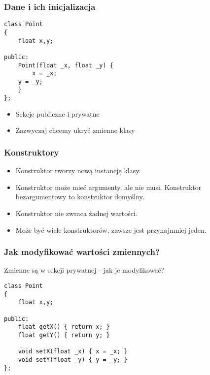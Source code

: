 \documentclass[pdftex, smaller]{beamer}
\begin{document}
\begin{frame}[fragile]
\frametitle{Dane i ich inicjalizacja}

\begin{lstlisting}
class Point
{
    float x,y;
    
public:
    Point(float _x, float _y) {
    	x = _x;
	y = _y;
    }
};
\end{lstlisting}

\begin{itemize}
\item Sekcje publiczne i prywatne
\item Zazwyczaj chcemy ukryć zmienne klasy
\end{itemize}

\end{frame}

\begin{frame}
\frametitle{Konstruktory}

\begin{itemize}
\item Konstruktor tworzy nową instancję klasy.
\item Konstruktor może mieć argumenty, ale nie musi. Konstruktor bezargumentowy to konstruktor domyślny.
\item Konstruktor nie zwraca żadnej wartości.
\item Może być wiele konstruktorów, zawsze jest przynajmniej jeden.
\end{itemize}

\end{frame}

\begin{frame}[fragile]
\frametitle{Jak modyfikować wartości zmiennych?}

Zmienne są w sekcji prywatnej - jak je modyfikować?

\begin{lstlisting}
class Point
{
	float x,y;
    
public:
	float getX() { return x; }
	float getY() { return y; }
	
	void setX(float _x) { x = _x; }
	void setY(float _y) { y = _y; }
};
\end{lstlisting}

\end{frame}
\end{document}

